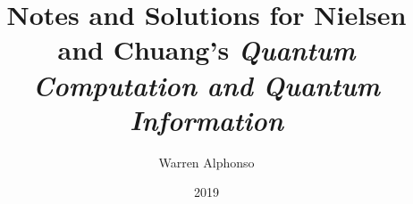 \documentclass[9pt]{extbook}
\title{Notes and Solutions for Nielsen and Chuang's \textit{Quantum Computation and Quantum Information}}
\date{2019}
\author{Warren Alphonso}
\begin{document}
\frontmatter 
\let\cleardoublepage\clearpage 
\maketitle
\tableofcontents

\mainmatter





\end{document}
